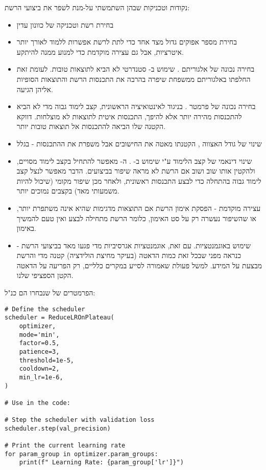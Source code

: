 נקודות וטכניקות שבהן השתמשתי על-מנת לשפר את ביצועי הרשת:

\begin{itemize}
    \item בחירת רשת וטכניקה של כוונון עדין
    \item בחירת מספר אפוקים גדול מצד אחד כדי לתת לרשת אפשרות ללמוד לאורך יותר איטרציות, אבל גם עצירה מוקדמת כדי למנוע ממנה להיתקע.
    \item בחירה נכונה של אלגוריתם . שימוש ב- סטנדרטי לא הביא לתוצאות טובות. לעומת זאת החלפתו באלגוריתם ממשפחת  שיפרה בהרבה את התכנסות הרשת והתוצאות הסופיות אליהן הגיעה.
    \item בחירה נכונה של פרמטר . בניגוד לאינטואיציה הראשונית, קצב לימוד גבוה מדי לא הביא להתכנסות מהירה יותר אלא להיפך, התכנסות איטית לתוצאות לא מוצלחות. דווקא הקטנה שלו הביאה להתכנסות אל תוצאות טובות יותר.
    \item שינוי של גודל האצווה , הקטנתו מאטה את החישובים אבל משפרת את ההתכנסות - בגלל
    \item שינוי דינאמי של קצב הלימוד ע"י שימוש ב- . ה- מאפשר להתחיל בקצב לימוד מסויים, ולהקטין אותו שוב ושוב אם הרשת לא מראה שיפור בביצועים. הדבר מאפשר לנצל קצב לימוד גבוה בהתחלה כדי לבצע התכנסות ראשונית, ולאחר מכן שיפור מקומי (שיכול להיות משמעותי מאד) בקצבים נמוכים יותר.
    \item עצירה מוקדמת  - הפסקת אימון הרשת אם התוצאות מדגימות שהיא אינה משתפרת יותר, או שהשיפור נעשרה רק על סט האימון, כלומר הרשת מתחילה לבצע  ואין טעם להמשיך באימון.
    \item שימוש באוגמנטציות. עם זאת, אוגמנטציות אגרסיביות מדי פגעו מאד בביצועי הרשת - כנראה מפני שבכל זאת כמות הדאטה (בעיקר מחיצת הולידציה) קטנה מדי והרשת מבצעת  על המידע. למשל פעולת  שאמורה לסייע במקרים כלליים, רק הפריעה על הדאטה הקטן הספציפי שלנו.
\end{itemize}

הפרמטרים של  שנבחרו הם כנ"ל:
\EN
\begin{tcolorbox}[colframe=black, colback=gray!5, boxrule=0.5mm, sharp corners]
\begin{verbatim}
# Define the scheduler
scheduler = ReduceLROnPlateau(
    optimizer,
    mode='min',
    factor=0.5,
    patience=3,
    threshold=1e-5,
    cooldown=2,
    min_lr=1e-6,
)

# Use in the code:

# Step the scheduler with validation loss
scheduler.step(val_precision)

# Print the current learning rate
for param_group in optimizer.param_groups:
    print(f" Learning Rate: {param_group['lr']}")
\end{verbatim}
\end{tcolorbox}
\HE


